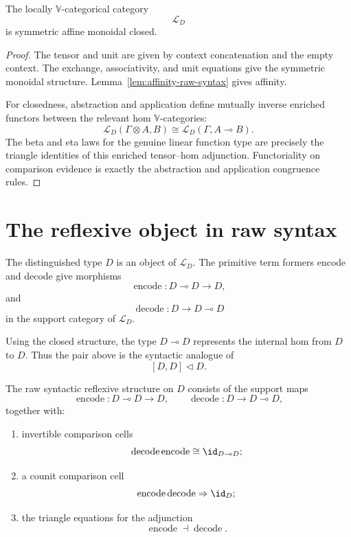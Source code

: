 \begin{proposition}
\label{prop:raw-affine-closed-structure}
The locally \(\mathbb V\)-categorical category
\[
    \mathcal L_D
\]
is symmetric affine monoidal closed.
\end{proposition}

\begin{proof}
The tensor and unit are given by context concatenation and the empty context.
The exchange, associativity, and unit equations give the symmetric monoidal
structure.  Lemma~\ref{lem:affinity-raw-syntax} gives affinity.

For closedness, abstraction and application define mutually inverse enriched
functors between the relevant hom \(\mathbb V\)-categories:
\[
    \mathcal L_D(\Gamma\otimes A,B)
    \cong
    \mathcal L_D(\Gamma,A\multimap B).
\]
The beta and eta laws for the genuine linear function type are precisely the
triangle identities of this enriched tensor--hom adjunction.  Functoriality on
comparison evidence is exactly the abstraction and application congruence
rules.
\end{proof}

\section{The reflexive object in raw syntax}
\label{sec:reflexive-object-raw-syntax}

The distinguished type \(D\) is an object of \(\mathcal L_D\).  The primitive
term formers encode and decode give morphisms
\[
    \operatorname{encode}:D\multimap D\longrightarrow D,
\]
and
\[
    \operatorname{decode}:D\longrightarrow D\multimap D
\]
in the support category of \(\mathcal L_D\).

Using the closed structure, the type \(D\multimap D\) represents the internal
hom from \(D\) to \(D\).  Thus the pair above is the syntactic analogue of
\[
    [D,D]\triangleleft D.
\]

\begin{definition}
\label{def:raw-syntactic-reflexive-structure}
The raw syntactic reflexive structure on \(D\) consists of the support maps
\[
    \operatorname{encode}:D\multimap D\to D,
    \qquad
    \operatorname{decode}:D\to D\multimap D,
\]
together with:

\begin{enumerate}
    \item invertible comparison cells
    \[
        \operatorname{decode}\operatorname{encode}
        \cong
        \id_{D\multimap D};
    \]

    \item a counit comparison cell
    \[
        \operatorname{encode}\operatorname{decode}
        \Rightarrow
        \id_D;
    \]

    \item the triangle equations for the adjunction
    \[
        \operatorname{encode}\dashv\operatorname{decode}.
    \]
\end{enumerate}
\end{definition}

